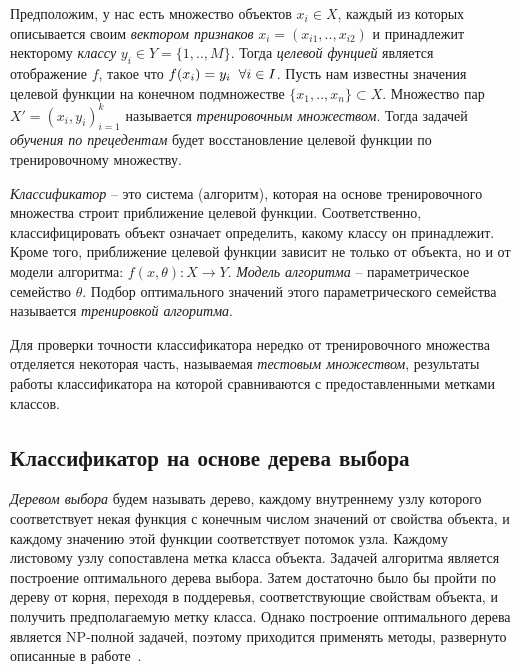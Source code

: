 \documentclass{article}
\begin{document}
Предположим, у нас есть множество объектов $x_i \in X$, каждый из которых описывается своим \emph{вектором признаков} $x_i = (x_{i1},.., x_{i2})$ и принадлежит некторому \emph{классу} $y_i \in Y = \{1,..,M\}$. Тогда \emph{целевой фунцией} является отображение $f$, такое что $f(x_i)=y_i \hspace{2mm} \forall i \in I$. Пусть нам известны значения целевой функции на конечном подмножестве $\{x_1,.., x_n\} \subset X$. Множество пар $X'=(x_i, y_i)_{i=1}^k$ называется \emph{тренировочным множеством}. 
Тогда задачей \emph{обучения по прецедентам} будет восстановление целевой функции по тренировочному множеству.

\emph{Классификатор} -- это система (алгоритм), которая на основе тренировочного множества строит приближение целевой функции. Соответственно, классифицировать объект означает определить, какому классу он принадлежит. Кроме того, приближение целевой функции зависит не только от объекта, но и от модели алгоритма: $f(x, \theta): X \rightarrow Y$. \emph{Модель алгоритма} -- параметрическое семейство $\theta$. Подбор оптимального значений этого параметрического семейства называется \emph{тренировкой алгоритма}.

Для проверки точности классификатора нередко от тренировочного множества отделяется некоторая часть, называемая \emph{тестовым множеством}, результаты работы классификатора на которой сравниваются с предоставленными метками классов. 
\subsection{Классификатор на основе дерева выбора}
\emph{Деревом выбора} будем называть дерево, каждому внутреннему узлу которого соответствует некая функция с конечным числом значений от свойства объекта, и каждому значению этой функции соответствует потомок узла. Каждому листовому узлу сопоставлена метка класса объекта. Задачей алгоритма является построение оптимального дерева выбора. Затем достаточно было бы пройти по дереву от корня, переходя в поддеревья, соответствующие свойствам объекта, и получить предполагаемую метку класса. Однако построение оптимального дерева является NP-полной задачей, поэтому приходится применять методы, развернуто описанные в работе~\cite{desicionTree}.
\end{document}
